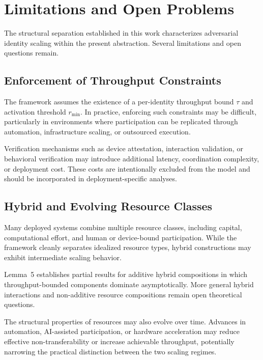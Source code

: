 \documentclass[journal]{IEEEtran}
\begin{document}
	\section{Limitations and Open Problems}
	
	The structural separation established in this work
	characterizes adversarial identity scaling within the
	present abstraction.
	Several limitations and open questions remain.
	
	\subsection{Enforcement of Throughput Constraints}
	
	The framework assumes the existence of a per-identity
	throughput bound $\tau$ and activation threshold
	$r_{\min}$.
	In practice, enforcing such constraints may be difficult,
	particularly in environments where participation can be
	replicated through automation, infrastructure scaling,
	or outsourced execution.
	
	Verification mechanisms such as device attestation,
	interaction validation, or behavioral verification may
	introduce additional latency, coordination complexity,
	or deployment cost.
	These costs are intentionally excluded from the model
	and should be incorporated in deployment-specific analyses.
	
	\subsection{Hybrid and Evolving Resource Classes}
	
	Many deployed systems combine multiple resource classes,
	including capital, computational effort, and human or
	device-bound participation.
	While the framework cleanly separates idealized resource
	types, hybrid constructions may exhibit intermediate
	scaling behavior.
	
	Lemma~5 establishes partial results for additive hybrid
	compositions in which throughput-bounded components
	dominate asymptotically.
	More general hybrid interactions and non-additive
	resource compositions remain open theoretical questions.
	
	The structural properties of resources may also evolve
	over time.
	Advances in automation, AI-assisted participation,
	or hardware acceleration may reduce effective
	non-transferability or increase achievable throughput,
	potentially narrowing the practical distinction between
	the two scaling regimes.
	
\end{document}
